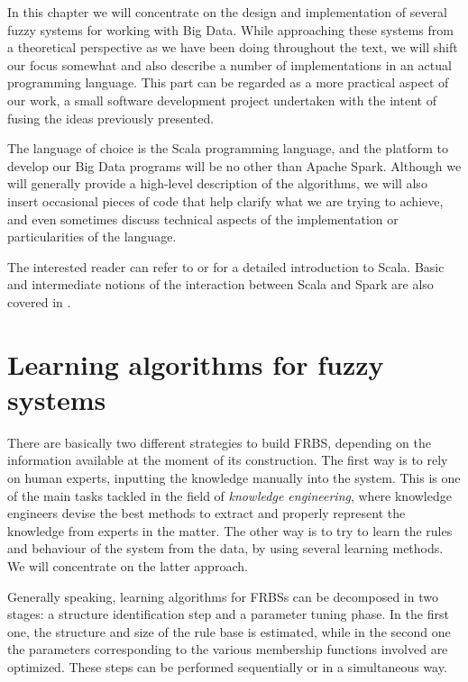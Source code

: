 %
%
%

In this chapter we will concentrate on the design and implementation of several fuzzy systems for working with Big Data. While approaching these systems from a theoretical perspective as we have been doing throughout the text, we will shift our focus somewhat and also describe a number of implementations in an actual programming language. This part can be regarded as a more practical aspect of our work, a small software development project undertaken with the intent of fusing the ideas previously presented.

The language of choice is the Scala programming language, and the platform to develop our Big Data programs will be no other than Apache Spark. Although we will generally provide a high-level description of the algorithms, we will also insert occasional pieces of code that help clarify what we are trying to achieve, and even sometimes discuss technical aspects of the implementation or particularities of the language.

The interested reader can refer to \cite{suereth2012scala} or \cite{odersky2008programming} for a detailed introduction to Scala. Basic and intermediate notions of the interaction between Scala and Spark are also covered in \cite{karau2015learning}.

\section{Learning algorithms for fuzzy systems}

There are basically two different strategies to build FRBS, depending on the information available at the moment of its construction. The first way is to rely on human experts, inputting the knowledge manually into the system. This is one of the main tasks tackled in the field of \textit{knowledge engineering}, where knowledge engineers devise the best methods to extract and properly represent the knowledge from experts in the matter. The other way is to try to learn the rules and behaviour of the system from the data, by using several learning methods. We will concentrate on the latter approach.

Generally speaking, learning algorithms for FRBSs can be decomposed in two stages: a structure identification step and a parameter tuning phase. In the first one, the structure and size of the rule base is estimated, while in the second one the parameters corresponding to the various membership functions involved are optimized. These steps can be performed sequentially or in a simultaneous way.

